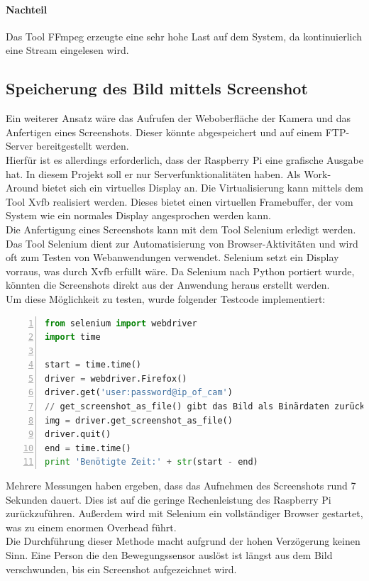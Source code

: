 \paragraph{Nachteil}
Das Tool FFmpeg erzeugte eine sehr hohe Last auf dem System, da kontinuierlich eine Stream eingelesen wird. 

\subsection{Speicherung des Bild mittels Screenshot}

Ein weiterer Ansatz wäre das Aufrufen der Weboberfläche der Kamera und das Anfertigen eines Screenshots. Dieser könnte abgespeichert und auf einem FTP-Server bereitgestellt werden. \\
Hierfür ist es allerdings erforderlich, dass der Raspberry Pi eine grafische Ausgabe hat. In diesem Projekt soll er nur Serverfunktionalitäten haben. Als Work-Around bietet sich ein virtuelles Display an. Die Virtualisierung kann mittels dem Tool Xvfb realisiert werden. Dieses bietet einen virtuellen Framebuffer, der vom System wie ein normales Display angesprochen werden kann. \\
Die Anfertigung eines Screenshots kann mit dem Tool Selenium erledigt werden. Das Tool Selenium dient zur Automatisierung von Browser-Aktivitäten und wird oft zum Testen von Webanwendungen verwendet. Selenium setzt ein Display vorraus, was durch Xvfb erfüllt wäre. Da Selenium nach Python portiert wurde, könnten die Screenshots direkt aus der Anwendung heraus erstellt werden. \\
Um diese Möglichkeit zu testen, wurde folgender Testcode implementiert:
\begin{lstlisting}[caption = Testcode - Aufnahme Screenshot mit Selenium, language=python, frame=single, breaklines=true,columns=fullflexible, commentstyle=\color{gray}\upshape, captionpos=b, numbers = left]
from selenium import webdriver
import time

start = time.time()
driver = webdriver.Firefox()
driver.get('user:password@ip_of_cam')
// get_screenshot_as_file() gibt das Bild als Binärdaten zurück
img = driver.get_screenshot_as_file()
driver.quit()
end = time.time()
print 'Benötigte Zeit:' + str(start - end)
\end{lstlisting}
Mehrere Messungen haben ergeben, dass das Aufnehmen des Screenshots rund 7 Sekunden dauert. Dies ist auf die geringe Rechenleistung des Raspberry Pi zurückzuführen. Außerdem wird mit Selenium ein vollständiger Browser gestartet, was zu einem enormen Overhead führt. \\
Die Durchführung dieser Methode macht aufgrund der hohen Verzögerung keinen Sinn. Eine Person die den Bewegungssensor auslöst ist längst aus dem Bild verschwunden, bis ein Screenshot aufgezeichnet wird.\\
